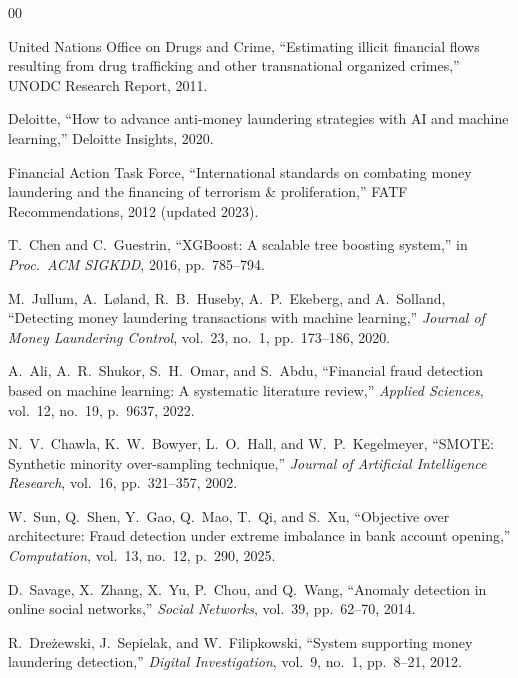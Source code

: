 \documentclass[conference]{IEEEtran}
\begin{document}
\begin{thebibliography}{00}

United Nations Office on Drugs and Crime, ``Estimating illicit financial flows resulting from drug trafficking and other transnational organized crimes,'' UNODC Research Report, 2011.

Deloitte, ``How to advance anti-money laundering strategies with AI and machine learning,'' Deloitte Insights, 2020.

Financial Action Task Force, ``International standards on combating money laundering and the financing of terrorism \& proliferation,'' FATF Recommendations, 2012 (updated 2023).

T.~Chen and C.~Guestrin, ``XGBoost: A scalable tree boosting system,'' in \textit{Proc.\ ACM SIGKDD}, 2016, pp.\ 785--794.

M.~Jullum, A.~L{\o}land, R.~B.~Huseby, A.~P.~Ekeberg, and A.~Solland, ``Detecting money laundering transactions with machine learning,'' \textit{Journal of Money Laundering Control}, vol.~23, no.~1, pp.\ 173--186, 2020.

A.~Ali, A.~R.~Shukor, S.~H.~Omar, and S.~Abdu, ``Financial fraud detection based on machine learning: A systematic literature review,'' \textit{Applied Sciences}, vol.~12, no.~19, p.\ 9637, 2022.

N.~V.~Chawla, K.~W.~Bowyer, L.~O.~Hall, and W.~P.~Kegelmeyer, ``SMOTE: Synthetic minority over-sampling technique,'' \textit{Journal of Artificial Intelligence Research}, vol.~16, pp.\ 321--357, 2002.

W.~Sun, Q.~Shen, Y.~Gao, Q.~Mao, T.~Qi, and S.~Xu, ``Objective over architecture: Fraud detection under extreme imbalance in bank account opening,'' \textit{Computation}, vol.~13, no.~12, p.\ 290, 2025.

D.~Savage, X.~Zhang, X.~Yu, P.~Chou, and Q.~Wang, ``Anomaly detection in online social networks,'' \textit{Social Networks}, vol.~39, pp.\ 62--70, 2014.

R.~Dre\.zewski, J.~Sepielak, and W.~Filipkowski, ``System supporting money laundering detection,'' \textit{Digital Investigation}, vol.~9, no.~1, pp.\ 8--21, 2012.


\end{thebibliography}
\end{document}
